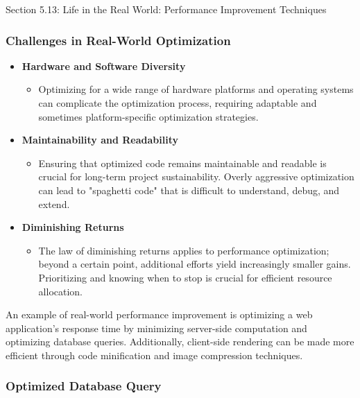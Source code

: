 \begin{notes}{Section 5.13: Life in the Real World: Performance Improvement Techniques}
    \subsubsection*{Challenges in Real-World Optimization}
    
    \begin{itemize}
        \item \textbf{Hardware and Software Diversity}
        \begin{itemize}
            \item Optimizing for a wide range of hardware platforms and operating systems can complicate the optimization process, requiring adaptable and sometimes platform-specific optimization 
            strategies.
        \end{itemize}
        \item \textbf{Maintainability and Readability}
        \begin{itemize}
            \item Ensuring that optimized code remains maintainable and readable is crucial for long-term project sustainability. Overly aggressive optimization can lead to "spaghetti code" that is 
            difficult to understand, debug, and extend.
        \end{itemize}
        \item \textbf{Diminishing Returns}
        \begin{itemize}
            \item The law of diminishing returns applies to performance optimization; beyond a certain point, additional efforts yield increasingly smaller gains. Prioritizing and knowing when to stop 
            is crucial for efficient resource allocation.
        \end{itemize}
    \end{itemize}
    
    \begin{highlight}
        An example of real-world performance improvement is optimizing a web application's response time by minimizing server-side computation and optimizing database queries. Additionally, client-side 
        rendering can be made more efficient through code minification and image compression techniques.
    
        \subsubsection*{Optimized Database Query}
    

\end{highlight}
\end{notes}
